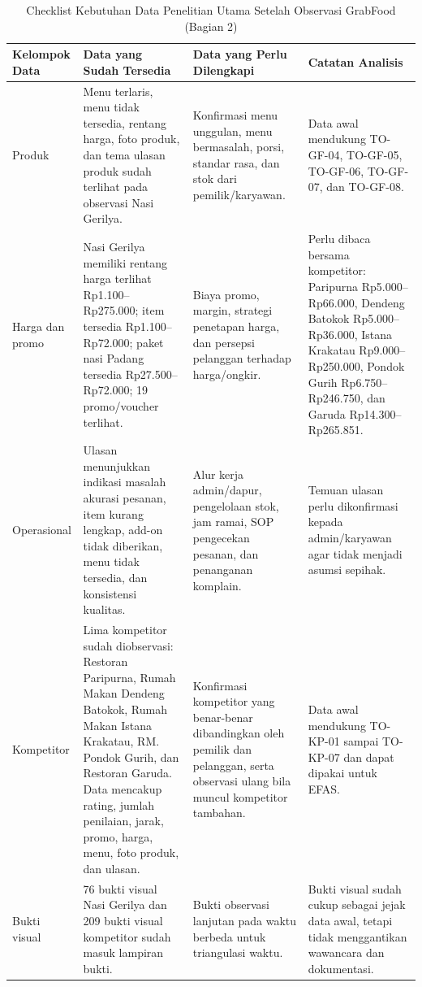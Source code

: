 \begin{table}[!htbp]
    \centering
    \caption{Checklist Kebutuhan Data Penelitian Utama Setelah Observasi GrabFood (Bagian 2)}
    \label{tab:checklist-kebutuhan-data-utama-lanjutan}
    \footnotesize
    \setlength{\tabcolsep}{3pt}
    \renewcommand{\arraystretch}{0.95}
    \begin{tabularx}{\textwidth}{|Z{2.5cm}|Y|Y|Y|}
        \toprule
        \textbf{Kelompok Data} & \textbf{Data yang Sudah Tersedia} & \textbf{Data yang Perlu Dilengkapi} & \textbf{Catatan Analisis} \\ \hline
        \midrule
        Produk & Menu terlaris, menu tidak tersedia, rentang harga, foto produk, dan tema ulasan produk sudah terlihat pada observasi Nasi Gerilya. & Konfirmasi menu unggulan, menu bermasalah, porsi, standar rasa, dan stok dari pemilik/karyawan. & Data awal mendukung TO-GF-04, TO-GF-05, TO-GF-06, TO-GF-07, dan TO-GF-08. \\ \hline
        Harga dan promo & Nasi Gerilya memiliki rentang harga terlihat Rp1.100--Rp275.000; item tersedia Rp1.100--Rp72.000; paket nasi Padang tersedia Rp27.500--Rp72.000; 19 promo/voucher terlihat. & Biaya promo, margin, strategi penetapan harga, dan persepsi pelanggan terhadap harga/ongkir. & Perlu dibaca bersama kompetitor: Paripurna Rp5.000--Rp66.000, Dendeng Batokok Rp5.000--Rp36.000, Istana Krakatau Rp9.000--Rp250.000, Pondok Gurih Rp6.750--Rp246.750, dan Garuda Rp14.300--Rp265.851. \\ \hline
        Operasional & Ulasan menunjukkan indikasi masalah akurasi pesanan, item kurang lengkap, add-on tidak diberikan, menu tidak tersedia, dan konsistensi kualitas. & Alur kerja admin/dapur, pengelolaan stok, jam ramai, SOP pengecekan pesanan, dan penanganan komplain. & Temuan ulasan perlu dikonfirmasi kepada admin/karyawan agar tidak menjadi asumsi sepihak. \\ \hline
        Kompetitor & Lima kompetitor sudah diobservasi: Restoran Paripurna, Rumah Makan Dendeng Batokok, Rumah Makan Istana Krakatau, RM. Pondok Gurih, dan Restoran Garuda. Data mencakup rating, jumlah penilaian, jarak, promo, harga, menu, foto produk, dan ulasan. & Konfirmasi kompetitor yang benar-benar dibandingkan oleh pemilik dan pelanggan, serta observasi ulang bila muncul kompetitor tambahan. & Data awal mendukung TO-KP-01 sampai TO-KP-07 dan dapat dipakai untuk EFAS. \\ \hline
        Bukti visual & 76 bukti visual Nasi Gerilya dan 209 bukti visual kompetitor sudah masuk lampiran bukti. & Bukti observasi lanjutan pada waktu berbeda untuk triangulasi waktu. & Bukti visual sudah cukup sebagai jejak data awal, tetapi tidak menggantikan wawancara dan dokumentasi. \\ \hline
        \bottomrule
    \end{tabularx}
\end{table}

